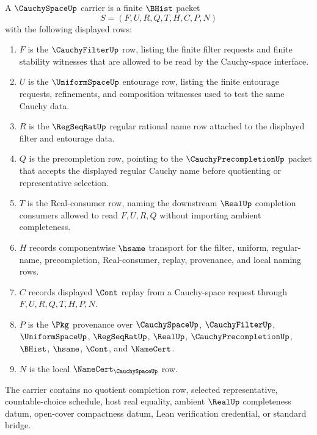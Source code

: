 \begin{definition}
\label{def:cauchyspace-carrier}
A $\CauchySpaceUp$ carrier is a finite $\BHist$ packet
$$
S=(F,U,R,Q,T,H,C,P,N)
$$
with the following displayed rows:
\begin{enumerate}
\item $F$ is the $\CauchyFilterUp$ row, listing the finite filter requests and finite stability witnesses that are allowed to be read by the Cauchy-space interface.
\item $U$ is the $\UniformSpaceUp$ entourage row, listing the finite entourage requests, refinements, and composition witnesses used to test the same Cauchy data.
\item $R$ is the $\RegSeqRatUp$ regular rational name row attached to the displayed filter and entourage data.
\item $Q$ is the precompletion row, pointing to the $\CauchyPrecompletionUp$ packet that accepts the displayed regular Cauchy name before quotienting or representative selection.
\item $T$ is the Real-consumer row, naming the downstream $\RealUp$ completion consumers allowed to read $F,U,R,Q$ without importing ambient completeness.
\item $H$ records componentwise $\hsame$ transport for the filter, uniform, regular-name, precompletion, Real-consumer, replay, provenance, and local naming rows.
\item $C$ records displayed $\Cont$ replay from a Cauchy-space request through $F,U,R,Q,T,H,P,N$.
\item $P$ is the $\Pkg$ provenance over $\CauchySpaceUp$, $\CauchyFilterUp$, $\UniformSpaceUp$, $\RegSeqRatUp$, $\RealUp$, $\CauchyPrecompletionUp$, $\BHist$, $\hsame$, $\Cont$, and $\NameCert$.
\item $N$ is the local $\NameCert_{\CauchySpaceUp}$ row.
\end{enumerate}
The carrier contains no quotient completion row, selected representative, countable-choice schedule, host real equality, ambient $\RealUp$ completeness datum, open-cover compactness datum, Lean verification credential, or standard bridge.
\end{definition}

